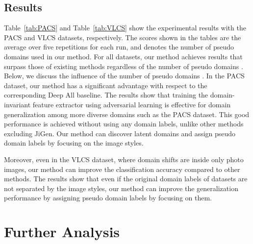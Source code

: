 \documentclass[letterpaper]{article} \usepackage{aaai20}  \usepackage{times}  \usepackage{helvet} \usepackage{courier}  \usepackage[hyphens]{url}  \usepackage{graphicx} \urlstyle{rm} \def\UrlFont{\rm}  \usepackage{graphicx}  \usepackage[whole]{bxcjkjatype}
\begin{document}
\subsection{Results}
Table~\ref{tab:PACS} and Table~\ref{tab:VLCS} show the experimental results with the PACS and VLCS datasets, respectively. The scores shown in the tables are the average over five repetitions for each run, and  denotes the number of pseudo domains used in our method. For all datasets, our method achieves results that surpass those of existing methods regardless of the number of pseudo domains .
Below, we discuss the influence of the number of pseudo domains . In the PACS dataset, our method has a significant advantage with respect to the corresponding Deep All baseline. The results show that training the domain-invariant feature extractor using adversarial learning is effective for domain generalization among more diverse domains such as the PACS dataset. This good performance is achieved without using any domain labels, unlike other methods excluding JiGen. Our method can discover latent domains and assign pseudo domain labels by focusing on the image styles.\par
Moreover, even in the VLCS dataset, where domain shifts are inside only photo images, our method can improve the classification accuracy compared to other methods.
The results show that even if the original domain labels of datasets are not separated by the image styles, our method can improve the generalization performance by assigning pseudo domain labels by focusing on them.

\section{Further Analysis}
\begin{table}[t]
    \centering
    \caption{Results of the ablation study in the PACS dataset. For details about the meaning of columns, see Table~\ref{tab:PACS}.}
    \label{tab:ablation}
\end{table}
\end{document}

